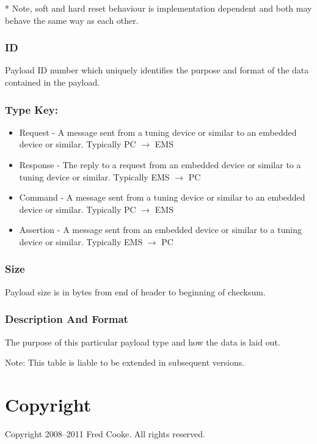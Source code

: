 \documentclass[12pt,a4paper,titlepage]{article}
\begin{document}
* Note, soft and hard reset behaviour is implementation
dependent and both may behave the same way as each other.
\normalsize


\subsubsection*{ID}
Payload ID number which uniquely identifies the purpose and format of the data
contained in the payload.

\subsubsection*{Type Key:}
\begin{itemize}
\item Request - A message sent from a tuning device or similar to an embedded
device or similar. Typically PC $\rightarrow$ EMS
\item Response - The reply to a request from an embedded device or similar to a
tuning device or similar. Typically EMS $\rightarrow$ PC
\item Command - A message sent from a tuning device or similar to an embedded
device or similar. Typically PC $\rightarrow$ EMS
\item Assertion - A message sent from an embedded device or similar to a tuning
device or similar. Typically EMS $\rightarrow$ PC
\end{itemize}

\subsubsection*{Size}
Payload size is in bytes from end of header to beginning of checksum.

\subsubsection*{Description And Format}
The purpose of this particular payload type and how the data is laid out.

Note: This table is liable to be extended in subsequent
versions.




\section{Copyright}

Copyright 2008--2011 Fred Cooke. All rights reserved.
\end{document}

